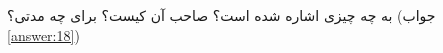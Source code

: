 \section{}
\paragraph{}\label{hint:85}
به چه چیزی اشاره شده است؟ صاحب آن کیست؟ برای چه مدتی؟ (جواب \ref{answer:18})